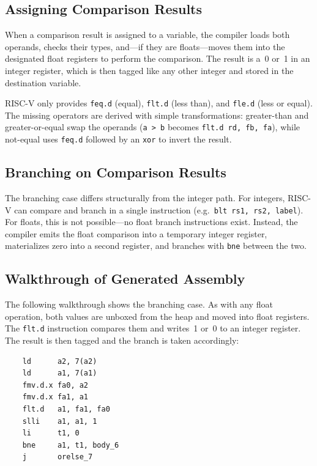 \subsection{Assigning Comparison Results}

When a comparison result is assigned to a variable, the compiler loads both operands, checks their types, and---if they are floats---moves them into the designated float registers to perform the comparison. The result is a~0 or~1 in an integer register, which is then tagged like any other integer and stored in the destination variable.

RISC-V only provides \texttt{feq.d} (equal), \texttt{flt.d} (less than), and \texttt{fle.d} (less or equal). The missing operators are derived with simple transformations: greater-than and greater-or-equal swap the operands (\texttt{a > b} becomes \texttt{flt.d rd, fb, fa}), while not-equal uses \texttt{feq.d} followed by an \texttt{xor} to invert the result.

\subsection{Branching on Comparison Results}

The branching case differs structurally from the integer path. For integers, RISC-V can compare and branch in a single instruction (e.g.\ \texttt{blt rs1, rs2, label}). For floats, this is not possible---no float branch instructions exist. Instead, the compiler emits the float comparison into a temporary integer register, materializes zero into a second register, and branches with \texttt{bne} between the two.

\subsection{Walkthrough of Generated Assembly}

The following walkthrough shows the branching case. As with any float operation, both values are unboxed from the heap and moved into float registers. The \texttt{flt.d} instruction compares them and writes~1 or~0 to an integer register. The result is then tagged and the branch is taken accordingly:

\begin{lstlisting}
    ld      a2, 7(a2)
    ld      a1, 7(a1)
    fmv.d.x fa0, a2
    fmv.d.x fa1, a1
    flt.d   a1, fa1, fa0
    slli    a1, a1, 1
    li      t1, 0
    bne     a1, t1, body_6
    j       orelse_7
\end{lstlisting}


